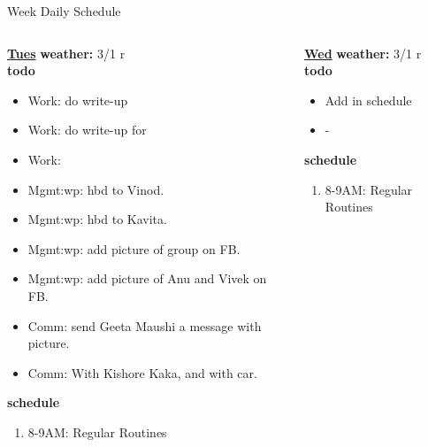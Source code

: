 {{\begin{block}{Week Daily Schedule}
\begin{columns}
          \begin{column}{0.14\textwidth}{\small \underline{\bf Tues}}
            {\small \bf weather: } 3/1 r \\ 
            {\small {\bf todo}}\\ 
            \begin{itemize}
              \tiny \item \tiny Work: do write-up 
            \item \tiny Work: do write-up for 
            \item \tiny Work: 
            \item \tiny Mgmt:wp: hbd to Vinod. 
            \item \tiny Mgmt:wp: hbd to Kavita. 
            \item \tiny Mgmt:wp: add picture of group on FB. 
            \item \tiny Mgmt:wp: add picture of Anu and Vivek on FB.  
            \item \tiny Comm: send Geeta Maushi a message with
              picture. 
            \item \tiny Comm: With Kishore Kaka, and with car. 
             
 
            \end{itemize} 
                {\small {\bf schedule}}
                \begin{enumerate} 
                  \tiny \item \tiny 8-9AM: Regular Routines 
                \end{enumerate} 
          \end{column}

          \begin{column}{0.14\textwidth}{\small \underline{\bf Wed}}
            {\small \bf weather: } 3/1 r \\ 
            \small{\bf todo}\\
            \begin{itemize}
              \tiny \item \tiny Add in schedule
            \item \tiny -
            \end{itemize} 
                {\small {\bf schedule}}\\
                \begin{enumerate} 
                  \tiny \item \tiny 8-9AM: Regular Routines 
                \end{enumerate} 
          \end{column}


\end{columns}
\end{block}}}
